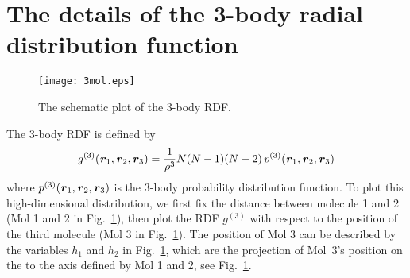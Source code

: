 \documentclass[aps,a4paper,reprint,onecolumn]{revtex4}
\newcommand{\vect}[1]{\textbf{\textit{#1}}}
\begin{document}
\section{The details of the 3-body radial distribution function}
\label{app:3}

\begin{figure}
  \centering
  \texttt{[image: 3mol.eps]}
  \caption{The schematic plot of the 3-body RDF.}\label{fig:tmp3}
\end{figure}



The 3-body RDF is defined by
\begin{align}
  g^{(3)}(\vect r_1, \vect r_2, \vect r_3) =
  \frac{1}{\rho^3}N(N-1)(N-2) \,p^{(3)}(\vect r_1, \vect r_2, \vect r_3) 
\end{align}
where $p^{(3)}(\vect r_1, \vect r_2, \vect r_3) $ is the 3-body
probability distribution function. To plot this high-dimensional
distribution, we first fix the distance between molecule 1 and 2 (Mol
1 and 2 in Fig.~\ref{fig:tmp3}), then plot the RDF $g^{(3)}$ with
respect to the position of the third molecule (Mol 3 in
Fig.~\ref{fig:tmp3}).  The position of Mol 3 can be described by
the variables $h_1$ and $h_2$ in Fig.~\ref{fig:tmp3}, which are
the projection of Mol~3's position on the to the
axis defined by Mol 1 and 2, see Fig.~\ref{fig:tmp3}.
\end{document}
